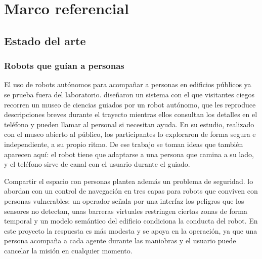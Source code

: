 \chapter{Marco referencial}
\label{cap:marco}

\section{Estado del arte}
\label{sec:antecedentes}

\subsection{Robots que guían a personas}

El uso de robots autónomos para acompañar a personas en edificios públicos ya se prueba
fuera del laboratorio. \textcite{kayukawa2023enhancing} diseñaron un sistema con el que
visitantes ciegos recorren un museo de ciencias guiados por un robot autónomo, que les
reproduce descripciones breves durante el trayecto mientras ellos consultan los detalles
en el teléfono y pueden llamar al personal si necesitan ayuda. En su estudio, realizado
con el museo abierto al público, los participantes lo exploraron de forma segura e
independiente, a su propio ritmo. De ese trabajo se toman ideas que también aparecen
aquí: el robot tiene que adaptarse a una persona que camina a su lado, y el teléfono
sirve de canal con el usuario durante el guiado.

Compartir el espacio con personas plantea además un problema de seguridad.
\textcite{omer2025multilayer} lo abordan con un control de navegación en tres capas para
robots que conviven con personas vulnerables: un operador señala por una interfaz los
peligros que los sensores no detectan, unas barreras virtuales restringen ciertas zonas
de forma temporal y un modelo semántico del edificio condiciona la conducta del robot.
En este proyecto la respuesta es más modesta y se apoya en la operación, ya que una
persona acompaña a cada agente durante las maniobras y el usuario puede cancelar la
misión en cualquier momento.

